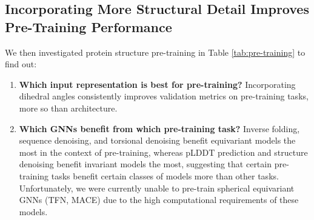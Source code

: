 \subsection{Incorporating More Structural Detail Improves Pre-Training Performance}

We then investigated protein structure pre-training in Table  \ref{tab:pre-training} to find out:
\begin{enumerate}
    \item \textbf{Which input representation is best for pre-training?} Incorporating dihedral angles consistently improves validation metrics on pre-training tasks, more so than architecture.
    \item \textbf{Which GNNs benefit from which pre-training task?} Inverse folding, sequence denoising, and torsional denoising benefit equivariant models the most in the context of pre-training, whereas pLDDT prediction and structure denoising benefit invariant models the most, suggesting that certain pre-training tasks benefit certain classes of models more than other tasks.
    Unfortunately, we were currently unable to pre-train spherical equivariant GNNs (TFN, MACE) due to the high computational requirements of these models.
\end{enumerate}



